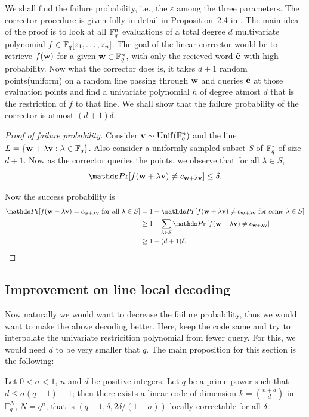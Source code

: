 We shall find the failure probability, i.e., the $\varepsilon$ among the three parameters. The corrector procedure is given fully in detail in Proposition~2.4 in \cite{Yek12}. The main idea of the proof is to look at all $\mathbb{F}_q^n$ evaluations of a total degree $d$ multivariate polynomial $f\in\mathbb{F}_q[z_1,\ldots,z_n]$. The goal of the linear corrector would be to retrieve $f(\mathbf{w})$ for a given $\mathbf{w}\in\mathbb{F}_q^n$, with only the recieved word $\tilde{\mathbf{c}}$ with high probability. Now what the corrector does is, it takes $d+1$ random points(uniform) on a random line passing through $\mathbf{w}$ and queries $\tilde{\mathbf{c}}$ at those evaluation points and find a univariate polynomial $h$ of degree atmost $d$ that is the restriction of $f$ to that line. We shall show that the failure probability of the corrector is atmost $(d+1)\delta$.

\begin{proof}[Proof of failure probability]
	Consider $\mathbf{v}\sim\mathrm{Unif}(\mathbb{F}_q^n)$ and the line $L = \{\mathbf{w} + \lambda\mathbf{v} : \lambda\in\mathbb{F}_q\}$. Also consider a uniformly sampled subset $S$ of $\mathbb{F}_q^*$ of size $d+1$. Now as the corrector queries the points, we observe that for all $\lambda\in S$, 
	\[
	\Pr[f(\bfw + \lambda\bfv)\neq c_{\bfw + \lambda\bfv}]\leq \delta.
	\]
	
	Now the success probability is 
	\begin{align*}
		\Pr[f(\bfw + \lambda\bfv) =  c_{\bfw + \lambda\bfv} \text{ for all } \lambda\in S] 
		& = 1 - \Pr\left[f(\bfw + \lambda\bfv)\neq c_{\bfw + \lambda\bfv} \text{ for some } \lambda\in S\right]  \\ 
		& \geq 1 - \sum_{\lambda\in S} \Pr\left[f(\bfw + \lambda\bfv)\neq c_{\bfw + \lambda\bfv}\right] \\
		& \geq 1 - (d+1)\delta.
	\end{align*} 
	
\end{proof}


	\subsection{Improvement on line local decoding}

Now naturally we would want to decrease the failure probability, thus we would want to make the above decoding better. Here, keep the code same and try to interpolate the univariate restricition polynomial from fewer query. For this, we would need $d$ to be very smaller that $q$. The main proposition for this section is the following:
\begin{greybox}
		\begin{proposition}\label{improve}%
			Let $0<\sigma < 1$, $n$ and $d$ be positive integers. Let $q$ be a prime power such that $d \leq \sigma(q-1) - 1$; then there exists a linear code of dimension $k = \binom{n+d}{d}$ in $\mathbb{F}_q^N$, $N = q^n$, that is $(q-1, \delta, 2\delta/(1-\sigma))$-locally correctable for all $\delta$.
		\end{proposition}
\end{greybox}

